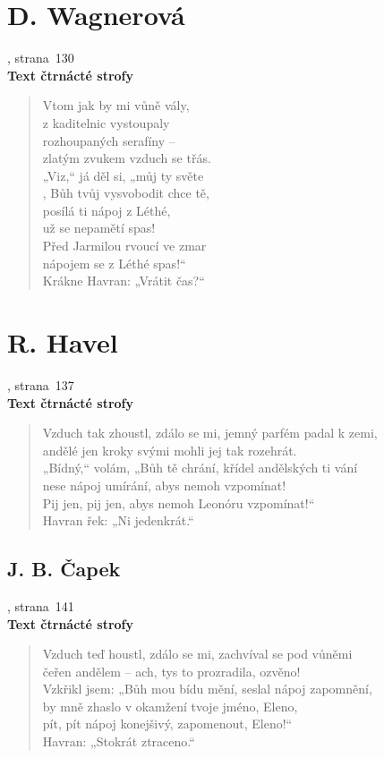 \documentclass[dp.tex]{subfiles}
\begin{document}
\section*{D. Wagnerová}
, strana~130
\\\textbf{Text čtrnácté strofy}
\begin{verse}
Vtom jak by mi vůně vály,\\
z kaditelnic vystoupaly\\
rozhoupaných serafíny --\\
zlatým zvukem vzduch se třás.\\
„Viz,“ já děl si, „můj ty světe\\,
Bůh tvůj vysvobodit chce tě,\\
posílá ti nápoj z Léthé,\\
už se nepamětí spas!\\
Před Jarmilou rvoucí ve zmar\\
nápojem se z Léthé spas!“\\
Krákne Havran: „Vrátit čas?“
\end{verse}

\section*{R. Havel}
, strana~137
\\\textbf{Text čtrnácté strofy}
\begin{verse}
Vzduch tak zhoustl, zdálo se mi, jemný parfém padal k zemi,\\
andělé jen kroky svými mohli jej tak rozehrát.\\
„Bídný,“ volám, „Bůh tě chrání, křídel andělských ti vání\\
nese nápoj umírání, abys nemoh vzpomínat!\\
Pij jen, pij jen, abys nemoh Leonóru vzpomínat!“\\
\hspace*{0.8cm}Havran řek: „Ni jedenkrát.“
\end{verse}

\begin{samepage}
\section*{J. B. Čapek}
, strana~141
\\\textbf{Text čtrnácté strofy}
\begin{verse}
Vzduch teď houstl, zdálo se mi, zachvíval se pod vůněmi\\
čeřen andělem -- ach, tys to prozradila, ozvěno!\\
Vzkřikl jsem: „Bůh mou bídu mění, seslal nápoj zapomnění,\\
by mně zhaslo v okamžení tvoje jméno, Eleno,\\
pít, pít nápoj konejšivý, zapomenout, Eleno!“\\
Havran: „Stokrát ztraceno.“
\end{verse}
\end{samepage}
\end{document}
